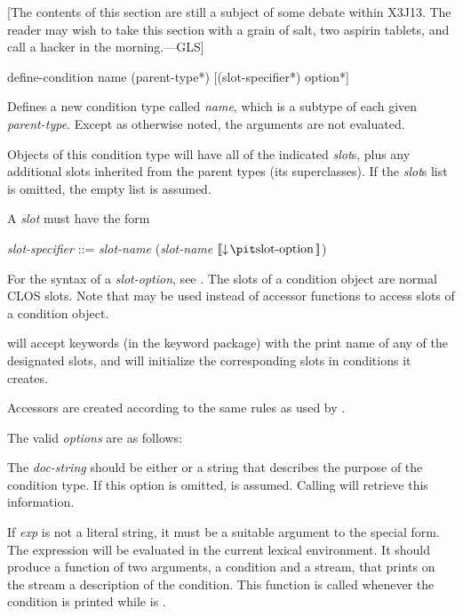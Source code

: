 [The contents of this section are still a subject of some debate within X3J13.
The reader may wish to take this section with a grain of salt, two aspirin
tablets, and call a hacker in the morning.---GLS]

\begin{defmac}
define-condition name ({parent-type}*)
                 [({slot-specifier}*) {option}*]

  Defines a new condition type called {\it name}, which is a subtype of each given
  {\it parent-type}.  Except as otherwise noted, the arguments are not evaluated.

  Objects of this condition type will have all of the indicated {\it slot\/}s, plus
  any additional slots inherited from the parent types (its superclasses).
  If the {\it slot\/}s list is omitted, the empty list is assumed.

  A {\it slot} must have the form
\begin{tabbing}
{\it slot-specifier\/} ::= {\it slot-name\/} {\Mor} ({\it slot-name\/}  $\lbrack\!\lbrack\downarrow\!\hbox{{\it slot-option}}\,\rbrack\!\rbrack$)
\end{tabbing}
For the syntax of a {\it slot-option}, see .
The slots of a condition object are normal CLOS slots.
Note that  may be used instead of accessor functions to access slots of a
condition object.

   will accept keywords (in the keyword package) with the
  print name of any of the designated slots, and will initialize the
  corresponding slots in conditions it creates.

  Accessors are created according to the same rules as used by .

  The valid {\it options} are as follows:

\begin{flushdesc}
\item[\cd{(:documentation {\it doc-string})}]

     The {\it doc-string} should be either  or
     a string that describes the purpose of the
     condition type. If this option is omitted,  is assumed.
     Calling  will retrieve this information.

\item[\cd{(:report {\it exp})}]

     If {\it exp} is not a literal string, it must be a suitable argument to the
      special form. The expression  will be evaluated
     in the current lexical environment. It should produce a function of two
     arguments, a condition and a stream, that prints on the stream a
     description of the condition. This function is called whenever the
     condition is printed while  is .


\end{flushdesc}
\end{defmac}
